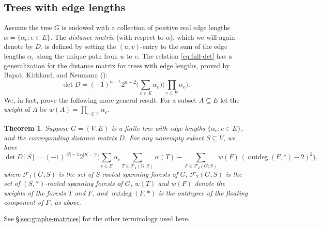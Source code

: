 \documentclass[12pt]{amsart}
\newtheorem{thm}{Theorem}[section]
\theoremstyle{definition}
\newcommand{\Da}{{D}}
\newcommand{\trees}{\mathcal{F}_1}
\newcommand{\forests}{\mathcal{F}}
\DeclareMathOperator{\outdeg}{outdeg}
\begin{document}
\subsection{Trees with edge lengths}
Assume the tree $G$ is endowed with a collection of positive real edge lengths $\alpha = \{\alpha_e \colon e\in E\}$. 
The {\em distance matrix} (with respect to $\alpha$), which we will again denote by $\Da$, is defined by setting the $(u,v)$-entry to the sum of the edge lengths $\alpha_e$ along the unique path from $u$ to $v$.
The relation \eqref{eq:full-det} has a generalization for the distance matrix for trees with edge lengths, proved by Bapat, Kirkland, and Neumann (\cite[Corollary 2.5]{bapat-kirkland-neumann}):
\begin{equation}\label{eq:w-full-det}
	\det \Da = (-1)^{n-1} 2^{n-2} \Big(\sum_{e \in E} \alpha_e\Big) \Big( \prod_{e \in E} \alpha_e \Big).
\end{equation}
We, in fact, prove the following more general result. 
For a subset $A \subseteq E$ let the {\em weight} of $A$ be $w(A) = \prod_{e \not\in A} \alpha_e$.
\begin{thm}
\label{thm:w-main}
Suppose $G = (V,E)$ is a finite tree with edge lengths $\{\alpha_e \colon e \in E\}$, and the corresponding distance matrix $\Da$. 
For any nonempty subset $S \subseteq V$, we have
\begin{equation}\label{eq:w-main}
	\det \Da[S] = (-1)^{|S|-1} 2^{|S|-2} \Bigg( \sum_{e \in E}\alpha_e \!\!\!\! \sum_{T \in \trees(G;S)} \!\! w(T) - \!\!\!\!\sum_{F \in \forests_2(G;S)} \!\!w(F)\, (\outdeg(F,*) - 2)^2 \!\Bigg),
\end{equation}
where 
$\trees(G;S)$ is the set of $S$-rooted spanning forests of $G$,
$\forests_2(G;S)$ is the set of $(S,*)$-rooted spanning forests of $G$,
$w(T)$ and $w(F)$ denote the weights of the forests $T$ and $F$,
and 
$\outdeg(F, *)$ is the outdegree of the floating component of $F$, as above.
\end{thm}
See \S\ref{sec:graphs-matrices} for the other terminology used here.
\end{document}
